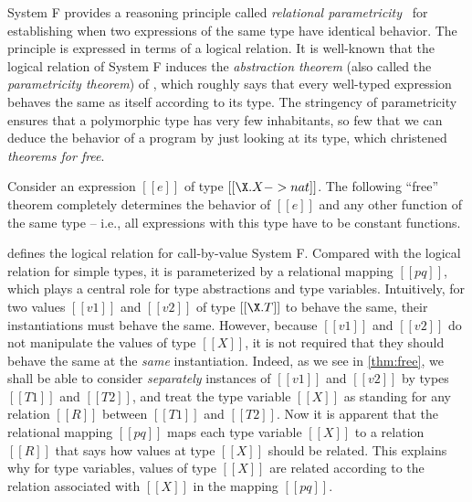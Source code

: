 System F provides a reasoning principle called \textit{relational
  parametricity}~\citep{reynolds1983types} for establishing when two expressions
of the same type have identical behavior. The principle is expressed in terms of
a logical relation. It is well-known that the logical relation of System F
induces the \textit{abstraction theorem} (also called the \textit{parametricity
  theorem}) of \citet{reynolds1983types}, which roughly says that every
well-typed expression behaves the same as itself according to its type. The
stringency of parametricity ensures that a polymorphic type has very few
inhabitants, so few that we can deduce the behavior of a program by just looking
at its type, which \citet{wadler1989theorems} christened \textit{theorems for
  free}.

Consider an expression $[[e]]$ of type $[[ \X . X -> nat ]]$. The following
``free'' theorem completely determines the behavior of $[[e]]$ and any other
function of the same type -- i.e., all expressions with this type have to be constant
functions.



 defines the logical relation for call-by-value System F.
Compared with the logical relation for simple types, it is parameterized by a
relational mapping $[[pq]]$, which plays a central role for type abstractions
and type variables. Intuitively, for two values $[[v1]]$ and $[[v2]]$ of type
$[[\X . T]]$ to behave the same, their instantiations must behave the same.
However, because $[[v1]]$ and $[[v2]]$ do not manipulate the values of type
$[[X]]$, it is not required that they should behave the same at the
\textit{same} instantiation. Indeed, as we see in \cref{thm:free}, we shall be
able to consider \textit{separately} instances of $[[v1]]$ and $[[v2]]$ by types
$[[T1]]$ and $[[T2]]$, and treat the type variable $[[X]]$ as standing for any
relation $[[R]]$ between $[[T1]]$ and $[[T2]]$. Now it is apparent that the
relational mapping $[[pq]]$ maps each type variable $[[X]]$ to a relation
$[[R]]$ that says how values at type $[[X]]$ should be related. This explains
why for type variables, values of type $[[X]]$ are related according to the
relation associated with $[[X]]$ in the mapping $[[pq]]$.



